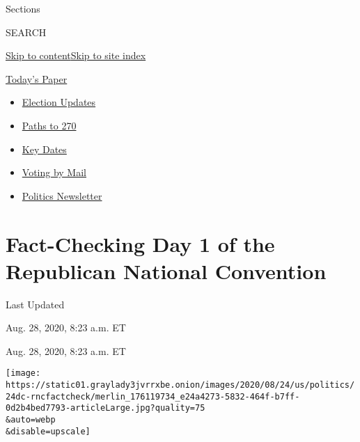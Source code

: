 Sections

SEARCH

\protect\hyperlink{site-content}{Skip to
content}\protect\hyperlink{site-index}{Skip to site index}

\href{https://myaccount.nytimes3xbfgragh.onion/auth/login?response_type=cookie\&client_id=vi}{}

\href{https://www.nytimes3xbfgragh.onion/section/todayspaper}{Today's
Paper}

\begin{itemize}
\item
  \href{https://www.nytimes3xbfgragh.onion/live/2020/09/11/us/trump-vs-biden?action=click\&pgtype=Article\&state=default\&region=TOP_BANNER\&context=storylines_menu}{Election
  Updates}
\item
  \href{https://www.nytimes3xbfgragh.onion/interactive/2020/us/elections/election-states-biden-trump.html?action=click\&pgtype=Article\&state=default\&region=TOP_BANNER\&context=storylines_menu}{Paths
  to 270}
\item
  \href{https://www.nytimes3xbfgragh.onion/interactive/2019/us/elections/2020-presidential-election-calendar.html?action=click\&pgtype=Article\&state=default\&region=TOP_BANNER\&context=storylines_menu}{Key
  Dates}
\item
  \href{https://www.nytimes3xbfgragh.onion/interactive/2020/08/31/us/politics/vote-by-mail-deadlines.html?action=click\&pgtype=Article\&state=default\&region=TOP_BANNER\&context=storylines_menu}{Voting
  by Mail}
\item
  \href{https://www.nytimes3xbfgragh.onion/newsletters/politics?action=click\&pgtype=Article\&state=default\&region=TOP_BANNER\&context=storylines_menu}{Politics
  Newsletter}
\end{itemize}

\hypertarget{fact-checking-day-1-of-the-republican-national-convention}{%
\section{Fact-Checking Day 1 of the Republican National
Convention}\label{fact-checking-day-1-of-the-republican-national-convention}}

Last Updated

Aug. 28, 2020, 8:23 a.m. ET

Aug. 28, 2020, 8:23 a.m. ET

\texttt{[image: https://static01.graylady3jvrrxbe.onion/images/2020/08/24/us/politics/24dc-rncfactcheck/merlin\_176119734\_e24a4273-5832-464f-b7ff-0d2b4bed7793-articleLarge.jpg?quality=75\\\&auto=webp\\\&disable=upscale]}

